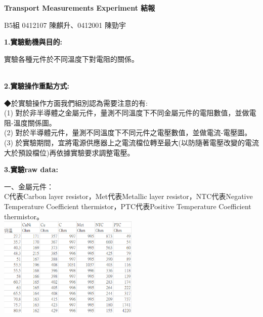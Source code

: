 \documentclass[UTF8]{ctexart}
\begin{document}
\begin{CJK*}{UTF8}{song}
\setlength{\baselineskip}{20pt} %

\begin{center}
\begin{LARGE} 
\textbf{Transport Measurements Experiment 結報} \\
\end{LARGE} 
\begin{large} 
B5組 0412107 陳麒升、0412001 陳勁宇  
\end{large}
\end{center}

\begin{large}
\textbf{1.實驗動機與目的:} \\
\end{large}
實驗各種元件於不同溫度下對電阻的關係。
 \\
 \\
%
\begin{large}
\textbf{2.實驗操作重點方式:} \\
\end{large}
◆於實驗操作方面我們組別認為需要注意的有: \\
(1) 對於非半導體之金屬元件，量測不同溫度下不同金屬元件的電阻數值，並做電阻-溫度關係圖。 \\
(2) 對於半導體元件，量測不同溫度下不同元件之電壓數值，並做電流-電壓圖。 \\
(3) 於實驗期間，宜將電源供應器上之電流檔位轉至最大(以防隨著電壓改變的電流大於預設檔位)再依據實驗要求調整電壓。 \\



\begin{large}
\textbf{3.實驗raw data:} \\
\end{large} 
一、金屬元件： \\
C代表Carbon layer resistor，Met代表Metallic layer resistor，NTC代表Negative Temperature Coefficient thermistor，PTC代表Positive Temperature Coefficient thermistor。  \\ 
\includegraphics[width = 0.5\textwidth]{allRes.png} \\
\newpage


\end{CJK*}
\end{document}
